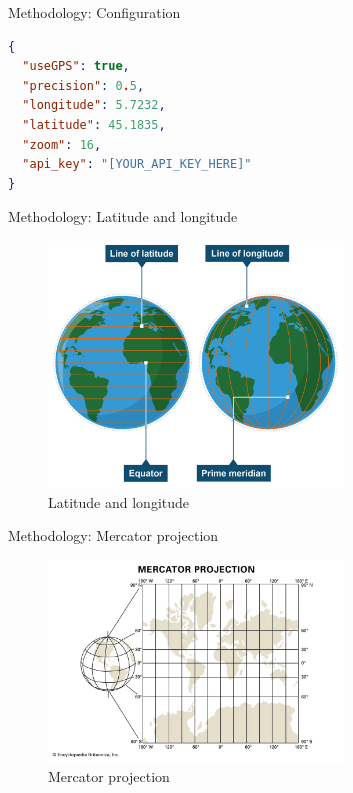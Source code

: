 \documentclass[10pt]{beamer}
\begin{document}
\begin{frame}[fragile]{Methodology: Configuration}
  \begin{lstlisting}[language=json]
{
  "useGPS": true,
  "precision": 0.5,
  "longitude": 5.7232,
  "latitude": 45.1835,
  "zoom": 16,
  "api_key": "[YOUR_API_KEY_HERE]"
}
  \end{lstlisting}
\end{frame}

\begin{frame}{Methodology: Latitude and longitude}
  \begin{figure}[H]
    \centering
    \includegraphics[width=0.7\textwidth]{images/lat-long.png}
    \caption{Latitude and longitude \cite{img:lat-lon}}
  \end{figure}
\end{frame}

\begin{frame}{Methodology: Mercator projection}
  \begin{figure}[H]
    \centering
    \includegraphics[width=0.7\textwidth]{images/mercator.png}
    \caption{Mercator projection \cite{img:mercator}}
  \end{figure}
\end{frame}
\end{document}
